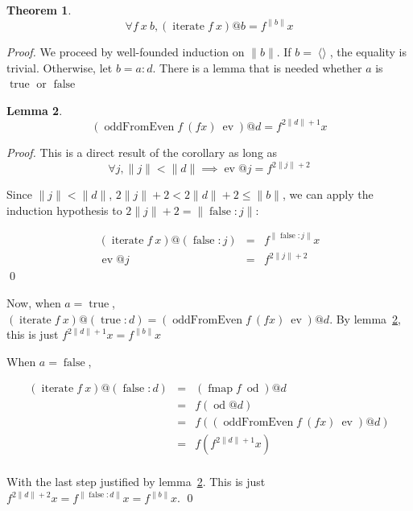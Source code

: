 \documentclass[envcountsect]{llncs}
\DeclareMathOperator{\oddFrom}{oddFromEven}
\DeclareMathOperator{\nil}{\langle\rangle}
\DeclareMathOperator{\true}{true}
\DeclareMathOperator{\false}{false}
\DeclareMathOperator{\fmap}{fmap}
\DeclareMathOperator{\iter}{iterate}
\newcommand{\ord}[1]{\|#1\|}
\newcommand{\cons}[2]{#1:#2}
\DeclareMathOperator{\ev}{ev}
\DeclareMathOperator{\od}{od}
\newtheorem{theorem}{Theorem}
\newtheorem{lemma}[theorem]{Lemma}
\begin{document}
\begin{theorem}\label{iterateCorrect}
\begin{displaymath}
\forall f\ x\ b, (\iter f\ x)@b = f^{\ord{b}} x
\end{displaymath}
\end{theorem}
\begin{proof}

We proceed by well-founded induction on $\ord{b}$.
If $b = \nil$, the equality is trivial.
Otherwise, let $b = \cons{a}{d}$.
There is a lemma that is needed whether $a$ is $\true$ or $\false$

\begin{lemma}\label{iterateSublemma}
\begin{displaymath}
(\oddFrom f\ (f x)\ \ev)@d = f^{2\ord{d}+1}x
\end{displaymath}
\end{lemma}
\begin{proof}
This is a direct result of the corollary as long as 
\begin{displaymath}
\forall j, \ord{j} < \ord{d} \implies \ev @j = f^{2\ord{j}+2}
\end{displaymath}

Since $\ord{j} < \ord{d}$, $2\ord{j}+2 < 2\ord{d}+2 \leq \ord{b}$, we can apply the induction hypothesis to $2\ord{j}+2 = \ord{\cons{\false}{j}}$:

\begin{displaymath}
\begin{array}{rcl}
(\iter f\ x)@(\cons{\false}{j}) & = & f^{\ord{\cons{\false}{j}}} x \\
\ev @j & = & f^{2\ord{j}+2}
\end{array}
\end{displaymath}
\qed
\end{proof}

Now, when $a = \true$, $(\iter f\ x)@(\cons{\true}{d}) = (\oddFrom f\ (f x)\ \ev)@d$.
By lemma~\ref{iterateSublemma}, this is just $f^{2\ord{d}+1}x = f^{\ord{b}}x$

When $a = \false$, 

\begin{displaymath}
\begin{array}{rcl}
(\iter f\ x)@(\cons{\false}{d}) & = & (\fmap f\ \od)@d \\
& = & f(\od @d) \\
& = & f((\oddFrom f\ (f x)\ \ev)@d) \\
& = & f(f^{2\ord{d}+1}x) \\
\end{array}
\end{displaymath}

With the last step justified by lemma~\ref{iterateSublemma}. This is just $f^{2\ord{d}+2}x = f^{\ord{\cons{\false}{d}}}x = f^{\ord{b}}x$.
\qed
\end{proof}
\end{document}
